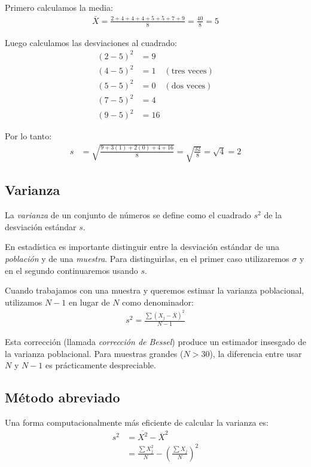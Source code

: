 \begin{solucion}
	Primero calculamos la media:
	\begin{align}
		\bar{X} = \frac{2+4+4+4+5+5+7+9}{8} = \frac{40}{8} = 5
	\end{align}
	
	Luego calculamos las desviaciones al cuadrado:
	\begin{align}
		(2-5)^2 &= 9 \\
		(4-5)^2 &= 1 \quad (\text{tres veces}) \\
		(5-5)^2 &= 0 \quad (\text{dos veces}) \\
		(7-5)^2 &= 4 \\
		(9-5)^2 &= 16
	\end{align}
	
	Por lo tanto:
	\begin{align}
		s &= \sqrt{\frac{9 + 3(1) + 2(0) + 4 + 16}{8}} = \sqrt{\frac{32}{8}} = \sqrt{4} = 2
	\end{align}
\end{solucion}


\subsection{Varianza}
La \emph{varianza} de un conjunto de números se define como el cuadrado $s^{2}$ de la desviación estándar $s$.

\begin{observacion}
	En estadística es importante distinguir entre la desviación estándar de una \emph{población} y de una \emph{muestra}. Para distinguirlas, en el primer caso utilizaremos $\sigma$ y en el segundo continuaremos usando $s.$
	
	Cuando trabajamos con una muestra y queremos estimar la varianza poblacional, utilizamos $N-1$ en lugar de $N$ como denominador:
	\begin{align}
		s^2 = \frac{\sum (X_j - \bar{X})^2}{N-1}
	\end{align}
	
	Esta corrección (llamada \emph{corrección de Bessel}) produce un estimador insesgado de la varianza poblacional. Para muestras grandes ($N > 30$), la diferencia entre usar $N$ y $N-1$ es prácticamente despreciable.
\end{observacion}


\subsection{Método abreviado}
Una forma computacionalmente más eficiente de calcular la varianza es:
\begin{align}
	s^{2} &= \overline{X^{2}} - \overline{X}^{2} \\
	&= \frac{\sum X_j^2}{N} - \left(\frac{\sum X_j}{N}\right)^2
\end{align}

